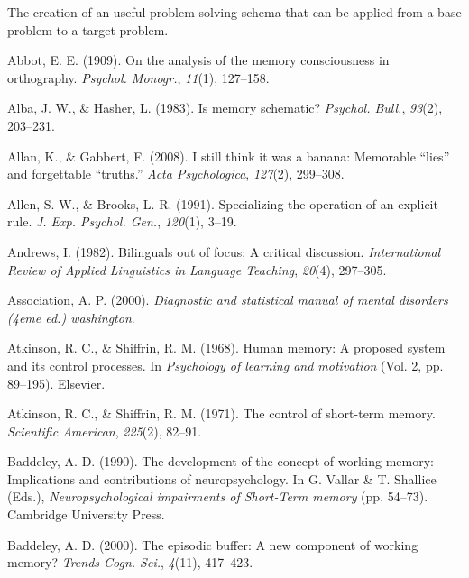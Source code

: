 \documentclass[
]{krantz}
\newlength{\cslhangindent}
\newlength{\cslentryspacingunit} %
\newenvironment{CSLReferences}[2] %
 {%
  \setlength{\parindent}{0pt}
  \ifodd #1
  \let\oldpar\par
  \def\par{\hangindent=\cslhangindent\oldpar}
  \fi
  \setlength{\parskip}{#2\cslentryspacingunit}
 }%
 {}
\begin{document}
The creation of an useful problem-solving schema that can be applied from a base problem to a target problem.

\hypertarget{refs}{}
\begin{CSLReferences}{1}{0}
\leavevmode{}%
Abbot, E. E. (1909). On the analysis of the memory consciousness in orthography. \emph{Psychol. Monogr.}, \emph{11}(1), 127--158.

\leavevmode{}%
Alba, J. W., \& Hasher, L. (1983). Is memory schematic? \emph{Psychol. Bull.}, \emph{93}(2), 203--231.

\leavevmode{}%
Allan, K., \& Gabbert, F. (2008). I still think it was a banana: Memorable {``lies''} and forgettable {``truths.''} \emph{Acta Psychologica}, \emph{127}(2), 299--308.

\leavevmode{}%
Allen, S. W., \& Brooks, L. R. (1991). Specializing the operation of an explicit rule. \emph{J. Exp. Psychol. Gen.}, \emph{120}(1), 3--19.

\leavevmode{}%
Andrews, I. (1982). Bilinguals out of focus: A critical discussion. \emph{International Review of Applied Linguistics in Language Teaching}, \emph{20}(4), 297--305.

\leavevmode{}%
Association, A. P. (2000). \emph{Diagnostic and statistical manual of mental disorders (4eme ed.) washington}.

\leavevmode{}%
Atkinson, R. C., \& Shiffrin, R. M. (1968). Human memory: A proposed system and its control processes. In \emph{Psychology of learning and motivation} (Vol. 2, pp. 89--195). Elsevier.

\leavevmode{}%
Atkinson, R. C., \& Shiffrin, R. M. (1971). The control of short-term memory. \emph{Scientific American}, \emph{225}(2), 82--91.

\leavevmode{}%
Baddeley, A. D. (1990). The development of the concept of working memory: Implications and contributions of neuropsychology. In G. Vallar \& T. Shallice (Eds.), \emph{Neuropsychological impairments of {Short-Term} memory} (pp. 54--73). Cambridge University Press.

\leavevmode{}%
Baddeley, A. D. (2000). The episodic buffer: A new component of working memory? \emph{Trends Cogn. Sci.}, \emph{4}(11), 417--423.


\end{CSLReferences}
\end{document}
